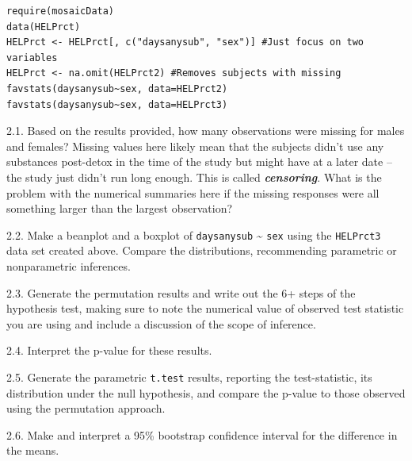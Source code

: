 \documentclass[]{book}
\theoremstyle{definition}
\theoremstyle{definition}
\theoremstyle{remark}
\begin{document}
\begin{verbatim}
require(mosaicData)
data(HELPrct)
HELPrct <- HELPrct[, c("daysanysub", "sex")] #Just focus on two variables
HELPrct <- na.omit(HELPrct2) #Removes subjects with missing
favstats(daysanysub~sex, data=HELPrct2)
favstats(daysanysub~sex, data=HELPrct3)
\end{verbatim}

2.1. Based on the results provided, how many observations were missing
for males and females? Missing values here likely mean that the subjects
didn't use any substances post-detox in the time of the study but might
have at a later date -- the study just didn't run long enough. This is
called \textbf{\emph{censoring}}. What is the problem with the numerical
summaries here if the missing responses were all something larger than
the largest observation?

2.2. Make a beanplot and a boxplot of \texttt{daysanysub}
\textasciitilde{} \texttt{sex} using the \texttt{HELPrct3} data set
created above. Compare the distributions, recommending parametric or
nonparametric inferences.

2.3. Generate the permutation results and write out the 6+ steps of the
hypothesis test, making sure to note the numerical value of observed
test statistic you are using and include a discussion of the scope of
inference.

2.4. Interpret the p-value for these results.

2.5. Generate the parametric \texttt{t.test} results, reporting the
test-statistic, its distribution under the null hypothesis, and compare
the p-value to those observed using the permutation approach.

2.6. Make and interpret a 95\% bootstrap confidence interval for the
difference in the means.


\end{document}
